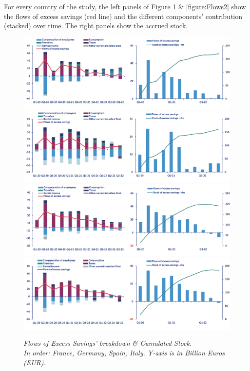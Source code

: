 For every country of the study, the left panels of Figure \ref{figure:Flows1} \& \ref{figure:Flows2} show the flows of excess savings (red line) and the different components' contribution (stacked) over time. The right panels show the accrued stock.

\begin{figure}[H]
    \centering
    \caption{\textit{Flows of Excess Savings’ breakdown \& Cumulated Stock. \\ In order: France, Germany, Spain, Italy. Y-axis is in Billion Euros (EUR).}}
    \includegraphics[width=.9\textwidth]{Core/1.Savings/img/xFrance.png}
    \includegraphics[width=.9\textwidth]{Core/1.Savings/img/xGermany.png}
    \includegraphics[width=.9\textwidth]{Core/1.Savings/img/xSpain.png}
    \includegraphics[width=.9\textwidth]{Core/1.Savings/img/xItaly.png}
    \label{figure:Flows1}
\end{figure}

